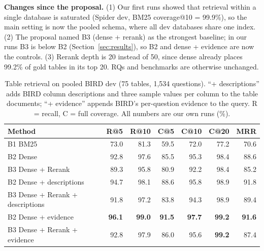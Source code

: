 \documentclass[sigconf,nonacm]{acmart}
\begin{document}
\textbf{Changes since the proposal.} (1) Our first runs showed that retrieval within a single database is saturated (Spider dev, BM25 coverage@10 = 99.9\%), so the main setting is now the pooled schema, where all dev databases share one index. (2) The proposal named B3 (dense + rerank) as the strongest baseline; in our runs B3 is below B2 (Section~\ref{sec:results}), so B2 and dense + evidence are now the controls. (3) Rerank depth is 20 instead of 50, since dense already places 99.2\% of gold tables in its top 20. RQs and benchmarks are otherwise unchanged.

\begin{table}[t]
\caption{Table retrieval on pooled BIRD dev (75 tables, 1,534 questions). ``+ descriptions'' adds BIRD column descriptions and three sample values per column to the table documents; ``+ evidence'' appends BIRD's per-question evidence to the query. R = recall, C = full coverage. All numbers are our own runs (\%).}
\label{tab:main}
\begin{tabular}{lrrrrrr}
\toprule
Method & R@5 & R@10 & C@5 & C@10 & C@20 & MRR\\
\midrule
B1 BM25 & 73.0 & 81.3 & 59.5 & 72.0 & 77.2 & 70.6\\
B2 Dense & 92.8 & 97.6 & 85.5 & 95.3 & 98.4 & 88.6\\
B3 Dense + Rerank & 89.3 & 95.8 & 80.9 & 92.2 & 98.4 & 85.2\\
\midrule
B2 Dense + descriptions & 94.7 & 98.1 & 88.6 & 95.8 & 98.9 & 91.8\\
B3 Dense + Rerank + descriptions & 91.8 & 97.2 & 83.8 & 94.3 & 98.9 & 89.4\\
\midrule
B2 Dense + evidence & \textbf{96.1} & \textbf{99.0} & \textbf{91.5} & \textbf{97.7} & \textbf{99.2} & \textbf{91.6}\\
B3 Dense + Rerank + evidence & 92.8 & 97.9 & 86.0 & 95.6 & \textbf{99.2} & 87.4\\
\bottomrule
\end{tabular}
\end{table}
\end{document}
